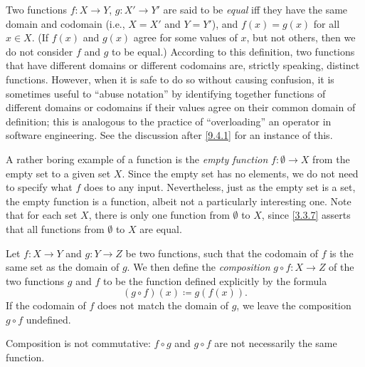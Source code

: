 \begin{defn}\label{3.3.7}
  Two functions \(f : X \to Y\), \(g : X' \to Y'\) are said to be \emph{equal} iff they have the same domain and codomain (i.e., \(X = X'\) and \(Y = Y'\)), and \(f(x) = g(x)\) for all \(x \in X\).
  (If \(f(x)\) and \(g(x)\) agree for some values of \(x\), but not others, then we do not consider \(f\) and \(g\) to be equal.)
  According to this definition, two functions that have different domains or different codomains are, strictly speaking, distinct functions.
  However, when it is safe to do so without causing confusion, it is sometimes useful to ``abuse notation'' by identifying together functions of different domains or codomains if their values agree on their common domain of definition;
  this is analogous to the practice of ``overloading'' an operator in software engineering.
  See the discussion after \cref{9.4.1} for an instance of this.
\end{defn}

\setcounter{thm}{8}
\begin{eg}\label{3.3.9}
  A rather boring example of a function is the \emph{empty function} \(f : \emptyset \to X\) from the empty set to a given set \(X\).
  Since the empty set has no elements, we do not need to specify what \(f\) does to any input.
  Nevertheless, just as the empty set is a set, the empty function is a function, albeit not a particularly interesting one.
  Note that for each set \(X\), there is only one function from \(\emptyset\) to \(X\), since \cref{3.3.7} asserts that all functions from \(\emptyset\) to \(X\) are equal.
\end{eg}

\begin{defn}[Composition]\label{3.3.10}
  Let \(f : X \to Y\) and \(g : Y \to Z\) be two functions, such that the codomain of \(f\) is the same set as the domain of \(g\).
  We then define the \emph{composition} \(g \circ f : X \to Z\) of the two functions \(g\) and \(f\) to be the function defined explicitly by the formula
  \[
    (g \circ f)(x) \coloneqq g(f(x)).
  \]
  If the codomain of \(f\) does not match the domain of \(g\), we leave the composition \(g \circ f\) undefined.
\end{defn}

\begin{note}
  Composition is not commutative:
  \(f \circ g\) and \(g \circ f\) are not necessarily the same function.
\end{note}


